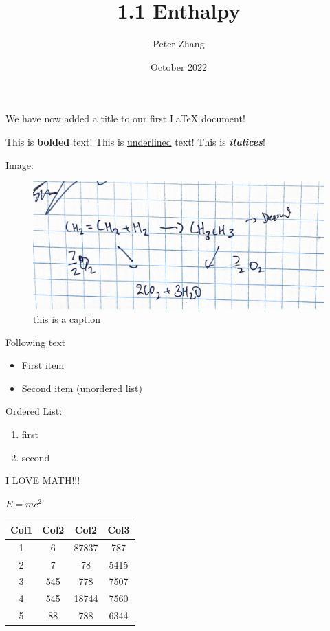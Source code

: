 \documentclass[12pt, letterpaper]{article}
\title{1.1 Enthalpy}
\author{Peter Zhang}
\date{October 2022}
\begin{document}
\maketitle
We have now added a title to our first \LaTeX{} document!

This is \textbf{bolded} text!
This is \underline{underlined} text!
This is \textbf{\textit{italices}}!


Image:

\begin{figure}[h]
	\centering
	\includegraphics[width=\textwidth]{images/1.2fig1.jpg}
	\caption{this is a caption}
	\label{fig:image}	
\end{figure}	

Following text

\begin{itemize}
\item First item
\item Second item (unordered list)
\end{itemize}


Ordered List:

\begin{enumerate}
\item first
\item second
\end{enumerate}

\maketitle
I LOVE MATH!!!

$E = mc^2$


\begin{center}
	\begin{tabular}{||c c c c||} 
	\hline
	Col1 & Col2 & Col2 & Col3 \\ [0.5ex] 
	\hline\hline
	1 & 6 & 87837 & 787 \\ 
	\hline
	2 & 7 & 78 & 5415 \\
	\hline
	3 & 545 & 778 & 7507 \\
	\hline
	4 & 545 & 18744 & 7560 \\
	\hline
	5 & 88 & 788 & 6344 \\ [1ex] 
	\hline
    \end{tabular}
\end{center}
\end{document}
